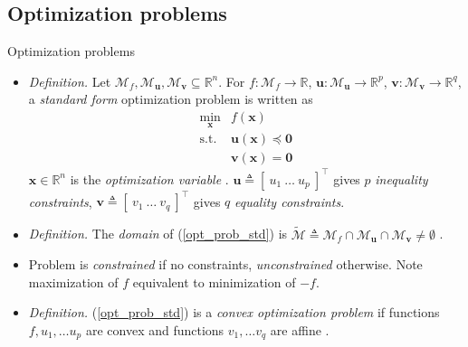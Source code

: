 \documentclass{beamer}
\numberwithin{equation}{section}
\newcommand{\aref}[1]{\alert{\ref{#1}}}
\begin{document}
\subsection{Optimization problems}

\begin{frame}{Optimization problems}
    \begin{itemize}
        \item
        \textit{Definition.} Let $ \mathcal{M}_f, \mathcal{M}_\mathbf{u},
        \mathcal{M}_\mathbf{v} \subseteq \mathbb{R}^n $. For
        $ f: \mathcal{M}_f \rightarrow \mathbb{R} $, $ \mathbf{u} :
        \mathcal{M}_\mathbf{u} \rightarrow \mathbb{R}^p $,
        $ \mathbf{v} : \mathcal{M}_\mathbf{v} \rightarrow \mathbb{R}^q $, a
        \textit{standard form} optimization problem is written as
        \cite{bv_convex_opt}
        \begin{equation} \label{opt_prob_std}
            \begin{array}{ll}
                \displaystyle\min_\mathbf{x} & f(\mathbf{x}) \\
                \text{s.t.} & \mathbf{u}(\mathbf{x}) \preceq \mathbf{0} \\
                & \mathbf{v}(\mathbf{x}) = \mathbf{0}
            \end{array}
        \end{equation}
        $ \mathbf{x} \in \mathbb{R}^n $ is the \textit{optimization
        variable} \cite{bv_convex_opt}. $ \mathbf{u} \triangleq
        [ \ u_1 \ \ldots \ u_p \ ]^\top $ gives $ p $ \textit{inequality
        constraints}, $ \mathbf{v} \triangleq [ \ v_1 \ \ldots \ v_q \ ]^\top $
        gives $ q $ \textit{equality constraints}.

        \item
        \textit{Definition.} The \textit{domain} of (\aref{opt_prob_std}) is
        $ \tilde{\mathcal{M}} \triangleq \mathcal{M}_f \cap
        \mathcal{M}_\mathbf{u} \cap \mathcal{M}_\mathbf{v} \ne \emptyset $
        \cite{bv_convex_opt}.

        \item
        Problem is \textit{constrained} if no constraints,
        \textit{unconstrained} otherwise. Note maximization of $ f $ 
        equivalent to minimization of $ -f $.

        \item
        \textit{Definition.} (\aref{opt_prob_std}) is a
        \textit{convex optimization problem} if functions
        $ f, u_1, \ldots u_p $ are convex and functions $ v_1, \ldots v_q $
        are affine \cite{bv_convex_opt}.
    \end{itemize}
\end{frame}
\end{document}
